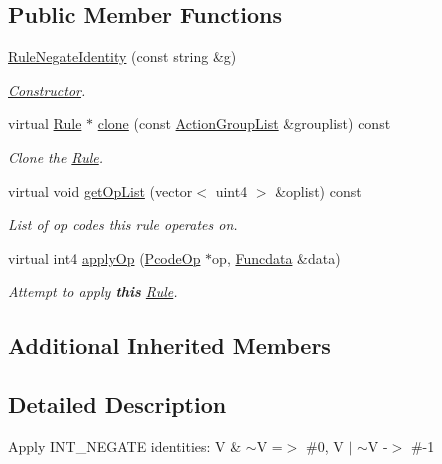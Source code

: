 \subsection*{Public Member Functions}
\begin{DoxyCompactItemize}
\item 
\mbox{\hyperlink{class_rule_negate_identity_a7c81a211d10e7c153f438dcff9f5b8f8}{Rule\+Negate\+Identity}} (const string \&g)
\begin{DoxyCompactList}\small\item\em \mbox{\hyperlink{class_constructor}{Constructor}}. \end{DoxyCompactList}\item 
virtual \mbox{\hyperlink{class_rule}{Rule}} $\ast$ \mbox{\hyperlink{class_rule_negate_identity_a359bedbb109cb97b3d27577486a51a7b}{clone}} (const \mbox{\hyperlink{class_action_group_list}{Action\+Group\+List}} \&grouplist) const
\begin{DoxyCompactList}\small\item\em Clone the \mbox{\hyperlink{class_rule}{Rule}}. \end{DoxyCompactList}\item 
virtual void \mbox{\hyperlink{class_rule_negate_identity_a7e6f7cc4b064dbb504527dcebe07e290}{get\+Op\+List}} (vector$<$ uint4 $>$ \&oplist) const
\begin{DoxyCompactList}\small\item\em List of op codes this rule operates on. \end{DoxyCompactList}\item 
virtual int4 \mbox{\hyperlink{class_rule_negate_identity_a9de23484c0f96f82044def3765270523}{apply\+Op}} (\mbox{\hyperlink{class_pcode_op}{Pcode\+Op}} $\ast$op, \mbox{\hyperlink{class_funcdata}{Funcdata}} \&data)
\begin{DoxyCompactList}\small\item\em Attempt to apply {\bfseries{this}} \mbox{\hyperlink{class_rule}{Rule}}. \end{DoxyCompactList}\end{DoxyCompactItemize}
\subsection*{Additional Inherited Members}


\subsection{Detailed Description}
Apply I\+N\+T\+\_\+\+N\+E\+G\+A\+TE identities\+: {\ttfamily V \& $\sim$V =$>$ \#0, V $\vert$ $\sim$V -\/$>$ \#-\/1} 

